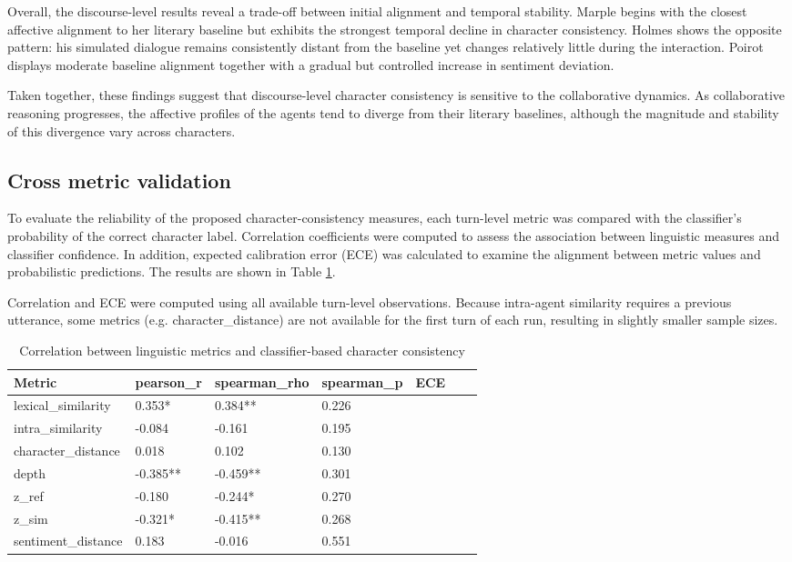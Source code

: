 \documentclass{article}
\begin{document}
Overall, the discourse-level results reveal a trade-off between initial alignment and temporal stability. Marple begins with the closest affective alignment to her literary baseline but exhibits the strongest temporal decline in character consistency. Holmes shows the opposite pattern: his simulated dialogue remains consistently distant from the baseline yet changes relatively little during the interaction. Poirot displays moderate baseline alignment together with a gradual but controlled increase in sentiment deviation.

Taken together, these findings suggest that discourse-level character consistency is sensitive to the collaborative dynamics. As collaborative reasoning progresses, the affective profiles of the agents tend to diverge from their literary baselines, although the magnitude and stability of this divergence vary across characters.


\subsection{Cross metric validation}

To evaluate the reliability of the proposed character-consistency measures, each turn-level metric was compared with the classifier’s probability of the correct character label. Correlation coefficients were computed to assess the association between linguistic measures and classifier confidence. In addition, expected calibration error (ECE) was calculated to examine the alignment between metric values and probabilistic predictions. The results are shown in Table \ref{master_table}.

Correlation and ECE were computed using all available turn-level observations. Because intra-agent similarity requires a previous utterance, some metrics (e.g. character\_distance) are not available for the first turn of each run, resulting in slightly smaller sample sizes. 


\begin{table}[H]
\centering
\begin{tabular}{l l l l l l l}\toprule
Metric & pearson\_r & spearman\_rho & spearman\_p & ECE \\\midrule
lexical\_similarity & 0.353*& 0.384**& 0.226 \\
intra\_similarity & -0.084 & -0.161 & 0.195 \\
character\_distance & 0.018 & 0.102 & 0.130 \\
depth & -0.385**& -0.459**& 0.301 \\
z\_ref & -0.180 & -0.244*& 0.270 \\
z\_sim & -0.321*& -0.415**& 0.268 \\
sentiment\_distance & 0.183 & -0.016 & 0.551 \\ \bottomrule
\end{tabular}
\caption{Correlation between linguistic metrics and classifier-based character consistency}
\label{master_table}
\end{table}
\end{document}

